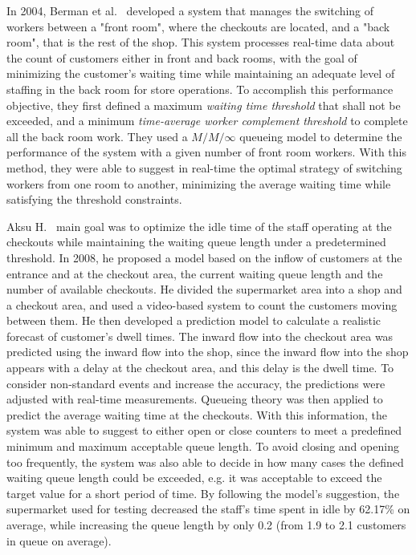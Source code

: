 In 2004, Berman et al.~\cite{berman} developed a system that manages the switching of workers between a "front room", where the checkouts are located, and a "back room", that is the rest of the shop. This system processes real-time data about the count of customers either in front and back rooms, with the goal of minimizing the customer's waiting time while maintaining an adequate level of staffing in the back room for store operations. To accomplish this performance objective, they first defined a maximum \emph{waiting time threshold} that shall not be exceeded, and a minimum \emph{time-average worker complement threshold} to complete all the back room work. They used a \( M/M/\infty \) queueing model to determine the performance of the system with a given number of front room workers. With this method, they were able to suggest in real-time the optimal strategy of switching workers from one room to another, minimizing the average waiting time while satisfying the threshold constraints.

Aksu H.~\cite{aksu} main goal was to optimize the idle time of the staff operating at the checkouts while maintaining the waiting queue length under a predetermined threshold. In 2008, he proposed a model based on the inflow of customers at the entrance and at the checkout area, the current waiting queue length and the number of available checkouts. He divided the supermarket area into a shop and a checkout area, and used a video-based system to count the customers moving between them. He then developed a prediction model to calculate a realistic forecast of customer's dwell times. The inward flow into the checkout area was predicted using the inward flow into the shop, since the inward flow into the shop appears with a delay at the checkout area, and this delay is the dwell time. To consider non-standard events and increase the accuracy, the predictions were adjusted with real-time measurements. Queueing theory was then applied to predict the average waiting time at the checkouts. With this information, the system was able to suggest to either open or close counters to meet a predefined minimum and maximum acceptable queue length. To avoid closing and opening too frequently, the system was also able to decide in how many cases the defined waiting queue length could be exceeded, e.g. it was acceptable to exceed the target value for a short period of time. By following the model’s suggestion, the supermarket used for testing decreased the staff’s time spent in idle by 62.17\% on average, while increasing the queue length by only 0.2 (from 1.9 to 2.1 customers in queue on average).

